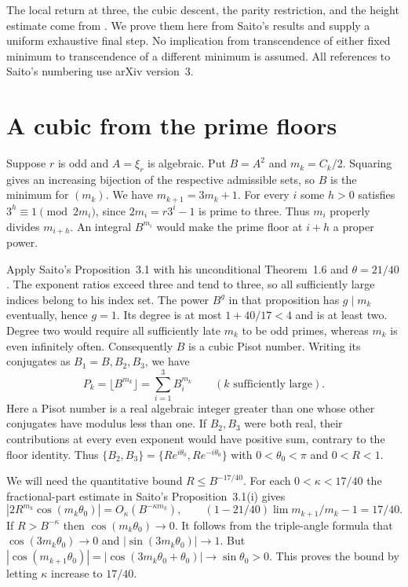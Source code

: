 \documentclass[11pt]{article}
\begin{document}
The local return
at three, the cubic descent, the parity restriction, and the height estimate
come from \cite{keio64,keio75}. We prove them here from Saito's results and
supply a uniform exhaustive final step. No implication from transcendence
of either fixed minimum to transcendence of a different minimum is assumed.
All references to Saito's numbering use arXiv version~3.

\section{A cubic from the prime floors}
Suppose $r$ is odd and $A=\xi_r$ is algebraic. Put $B=A^2$ and
$m_k=C_k/2$. Squaring gives an increasing bijection of the respective
admissible sets, so $B$ is the minimum for $(m_k)$. We have
$m_{k+1}=3m_k+1$. For every $i$ some $h>0$ satisfies
$3^h\equiv1\pmod {2m_i}$, since $2m_i=r3^i-1$ is prime to three.
Thus $m_i$ properly divides $m_{i+h}$. An integral $B^{m_i}$ would
make the prime floor at $i+h$ a proper power.

Apply Saito's Proposition~3.1 with his unconditional Theorem~1.6 and
$\theta=21/40$. The exponent ratios exceed three and tend to three,
so all sufficiently large indices belong to his index set. The power
$B^g$ in that proposition has $g\mid m_k$ eventually, hence $g=1$.
Its degree is at most $1+40/17<4$ and is at least two. Degree two would
require all sufficiently late $m_k$ to be odd primes, whereas $m_k$
is even infinitely often. Consequently $B$ is a cubic Pisot number.
Writing its conjugates as $B_1=B,B_2,B_3$, we have
\[
 P_k=\lfloor B^{m_k}\rfloor=\sum_{i=1}^3 B_i^{m_k}
 \qquad(k\text{ sufficiently large}).
\]
Here a Pisot number is a real algebraic integer greater than one whose
other conjugates have modulus less than one. If $B_2,B_3$ were both
real, their contributions at every even exponent would have positive
sum, contrary to the floor identity. Thus $\{B_2,B_3\}=\{Re^{i\theta_0},Re^{-i\theta_0}\}$
with $0<\theta_0<\pi$ and $0<R<1$.

We will need the quantitative bound $R\le B^{-17/40}$. For each
$0<\kappa<17/40$ the fractional-part estimate in Saito's Proposition~3.1(i)
gives
\[
 |2 R^{m_k}\cos(m_k\theta_0)|=O_\kappa(B^{-\kappa m_k}),
 \qquad (1-21/40)\lim m_{k+1}/m_k-1=17/40 .
\]
If $R>B^{-\kappa}$ then $\cos(m_k\theta_0)\to0$. It follows from the
triple-angle formula that $\cos(3m_k\theta_0)\to0$ and
$|\sin(3m_k\theta_0)|\to1$. But
$|\cos(m_{k+1}\theta_0)|=|\cos(3m_k\theta_0+\theta_0)|\to\sin\theta_0>0$.
This proves the bound by letting $\kappa$ increase to $17/40$.
\end{document}
